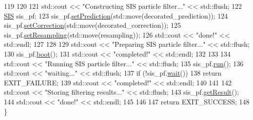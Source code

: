 \begin{DoxyCodeInclude}
119 
120 
121     std::cout << \textcolor{stringliteral}{"Constructing SIS particle filter..."} << std::flush;
122     \mbox{\hyperlink{classbfl_1_1SIS}{SIS}} sis\_pf;
123     sis\_pf.\mbox{\hyperlink{classbfl_1_1ParticleFilter_a213811368143c1f498c87be70cf02379}{setPrediction}}(std::move(decorated\_prediction));
124     sis\_pf.\mbox{\hyperlink{classbfl_1_1ParticleFilter_a3d2935addf4481325a3fe8b99fe4d07a}{setCorrection}}(std::move(decorated\_correction));
125     sis\_pf.\mbox{\hyperlink{classbfl_1_1ParticleFilter_ad1618ed06b6e6e143e309e2267b970ee}{setResampling}}(std::move(resampling));
126     std::cout << \textcolor{stringliteral}{"done!"} << std::endl;
127 
128 
129     std::cout << \textcolor{stringliteral}{"Preparing SIS particle filter..."} << std::flush;
130     sis\_pf.\mbox{\hyperlink{classbfl_1_1FilteringAlgorithm_a96651f8464190c0a56d79219a1017147}{boot}}();
131     std::cout << \textcolor{stringliteral}{"completed!"} << std::endl;
132 
133 
134     std::cout << \textcolor{stringliteral}{"Running SIS particle filter..."} << std::flush;
135     sis\_pf.\mbox{\hyperlink{classbfl_1_1FilteringAlgorithm_a009cbe5f4bbb16967f6c6ddcaed8fbb1}{run}}();
136     std::cout << \textcolor{stringliteral}{"waiting..."} << std::flush;
137     \textcolor{keywordflow}{if} (!sis\_pf.\mbox{\hyperlink{classbfl_1_1FilteringAlgorithm_a40372c24fa050eb0274371172df0a244}{wait}}())
138         \textcolor{keywordflow}{return} EXIT\_FAILURE;
139     std::cout << \textcolor{stringliteral}{"completed!"} << std::endl;
140 
141 
142     std::cout << \textcolor{stringliteral}{"Storing filtering results..."} << std::flush;
143     sis\_pf.\mbox{\hyperlink{classbfl_1_1SIS_a059da4c932379643ff7005fe4d0fda89}{getResult}}();
144     std::cout << \textcolor{stringliteral}{"done!"} << std::endl;
145 
146 
147     \textcolor{keywordflow}{return} EXIT\_SUCCESS;
148 \}
\end{DoxyCodeInclude}
 